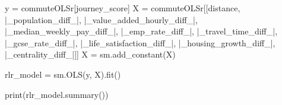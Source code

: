 \documentclass[
  number]{elsarticle}
\newenvironment{Shaded}{\begin{snugshade}}{\end{snugshade}}
\newcommand{\BuiltInTok}[1]{\textcolor[rgb]{0.00,0.23,0.31}{#1}}
\newcommand{\NormalTok}[1]{\textcolor[rgb]{0.00,0.23,0.31}{#1}}
\newcommand{\OperatorTok}[1]{\textcolor[rgb]{0.37,0.37,0.37}{#1}}
\newcommand{\StringTok}[1]{\textcolor[rgb]{0.13,0.47,0.30}{#1}}
\begin{document}
\begin{Shaded}
\begin{Highlighting}[]
\NormalTok{y }\OperatorTok{=}\NormalTok{ commuteOLSr[}\StringTok{\textquotesingle{}journey\_score\textquotesingle{}}\NormalTok{]}
\NormalTok{X }\OperatorTok{=}\NormalTok{ commuteOLSr[[}\StringTok{\textquotesingle{}distance\textquotesingle{}}\NormalTok{, }\StringTok{\textquotesingle{}|\_population\_diff\_|\textquotesingle{}}\NormalTok{, }\StringTok{\textquotesingle{}|\_value\_added\_hourly\_diff\_|\textquotesingle{}}\NormalTok{,}
                \StringTok{\textquotesingle{}|\_median\_weekly\_pay\_diff\_|\textquotesingle{}}\NormalTok{, }\StringTok{\textquotesingle{}|\_emp\_rate\_diff\_|\textquotesingle{}}\NormalTok{,}
                 \StringTok{\textquotesingle{}|\_travel\_time\_diff\_|\textquotesingle{}}\NormalTok{, }\StringTok{\textquotesingle{}|\_gcse\_rate\_diff\_|\textquotesingle{}}\NormalTok{,}
                 \StringTok{\textquotesingle{}|\_life\_satisfaction\_diff\_|\textquotesingle{}}\NormalTok{, }\StringTok{\textquotesingle{}|\_housing\_growth\_diff\_|\textquotesingle{}}\NormalTok{,}
                 \StringTok{\textquotesingle{}|\_centrality\_diff\_|\textquotesingle{}}\NormalTok{]]}
\NormalTok{X }\OperatorTok{=}\NormalTok{ sm.add\_constant(X)}

\NormalTok{rlr\_model }\OperatorTok{=}\NormalTok{ sm.OLS(y, X).fit()}

\BuiltInTok{print}\NormalTok{(rlr\_model.summary())}
\end{Highlighting}
\end{Shaded}
\end{document}
